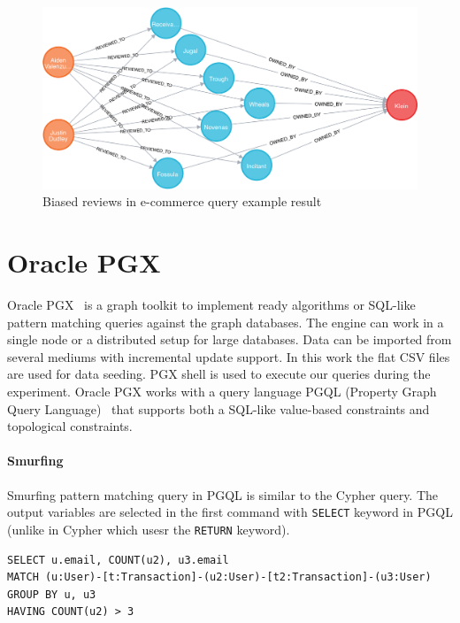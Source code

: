 \begin{figure}[!ht]
  \centering
  \includegraphics[width=\textwidth]{figures/biased_reviews_output.png}
  \caption{Biased reviews in e-commerce query example result} 
  \label{fig:biased_reviews_output}
\end{figure}

\section{Oracle PGX}

Oracle PGX~\cite{pgx_website} is a graph toolkit to implement ready algorithms or SQL-like pattern matching queries against the graph databases.
The engine can work in a single node or a distributed setup for large databases.
Data can be imported from several mediums with incremental update support.
In this work the flat CSV files are used for data seeding.
PGX shell is used to execute our queries during the experiment.
Oracle PGX works with a query language PGQL (Property Graph Query Language)~\cite{pgql_website} that supports both a SQL-like value-based constraints and topological constraints.

\paragraph{Smurfing}

Smurfing pattern matching query in PGQL is similar to the Cypher query.
The output variables are selected in the first command with \texttt{SELECT} keyword in PGQL (unlike in Cypher which usesr the \texttt{RETURN} keyword).

\begin{lstlisting}[language=Cypher,frame=single,caption={PGQL smurfing query},label={lst:smurfing_pgql}]
SELECT u.email, COUNT(u2), u3.email
MATCH (u:User)-[t:Transaction]-(u2:User)-[t2:Transaction]-(u3:User)
GROUP BY u, u3
HAVING COUNT(u2) > 3
\end{lstlisting}

